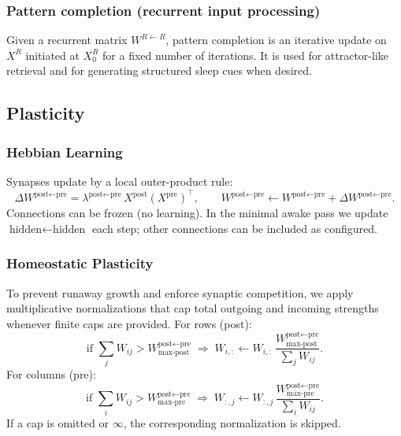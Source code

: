 \documentclass{article}
\begin{document}
\subsubsection*{Pattern completion (recurrent input processing)}
Given a recurrent matrix $W^{R\leftarrow R}$, pattern completion is an iterative update on $X^{R}$ initiated at $X^{R}_0$ for a fixed number of iterations. It is used for attractor-like retrieval and for generating structured sleep cues when desired.

\subsection*{Plasticity}
\subsubsection*{Hebbian Learning}
Synapses update by a local outer-product rule:
\begin{equation}
            \Delta W^{\textrm{post} \leftarrow \textrm{pre}} = \lambda^{\textrm{post} \leftarrow \textrm{pre}}\, X^{\textrm{post}} (X^{\textrm{pre}})^\top,\qquad
            W^{\textrm{post} \leftarrow \textrm{pre}} \leftarrow W^{\textrm{post} \leftarrow \textrm{pre}} + \Delta W^{\textrm{post} \leftarrow \textrm{pre}}.
\end{equation}
Connections can be frozen (no learning). In the minimal awake pass we update $\text{hidden}\leftarrow\text{hidden}$ each step; other connections can be included as configured.

\subsubsection*{Homeostatic Plasticity}
To prevent runaway growth and enforce synaptic competition, we apply multiplicative normalizations that cap total outgoing and incoming strengths whenever finite caps are provided. For rows (post):
\begin{equation}
    \text{if }\sum_j W_{ij} > W^{\textrm{post}\leftarrow\textrm{pre}}_{\text{max-post}}\;\Rightarrow\; W_{i,:} \leftarrow W_{i,:}\,\frac{W^{\textrm{post}\leftarrow\textrm{pre}}_{\text{max-post}}}{\sum_j W_{ij}}.
\end{equation}
For columns (pre):
\begin{equation}
    \text{if }\sum_i W_{ij} > W^{\textrm{post}\leftarrow\textrm{pre}}_{\text{max-pre}}\;\Rightarrow\; W_{:,j} \leftarrow W_{:,j}\,\frac{W^{\textrm{post}\leftarrow\textrm{pre}}_{\text{max-pre}}}{\sum_i W_{ij}}.
\end{equation}
If a cap is omitted or $\infty$, the corresponding normalization is skipped.
\end{document}
